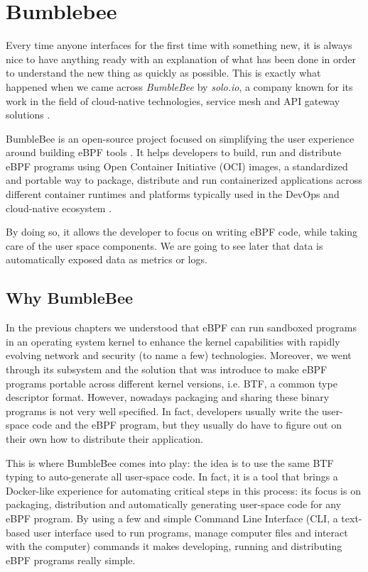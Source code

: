 \section{Bumblebee}

Every time anyone interfaces for the first time with something new, it is always nice to have anything ready with an explanation of what has been done in order to understand the new thing as quickly as possible.
This is exactly what happened when we came across \textit{BumbleBee} \cite{BumbleBeeWebsite} by \textit{solo.io}, a company known for its work in the field of cloud-native technologies, service mesh and API gateway solutions \cite{soloioWebsite}.

BumbleBee is an open-source project focused on simplifying the user experience around building eBPF tools \cite{BumbleBeeRepo}. 
It helps developers to build, run and distribute eBPF programs using Open Container Initiative (OCI) images, a standardized and portable way to package, distribute and run containerized applications across different container runtimes and platforms typically used in the DevOps and cloud-native ecosystem \cite{OCIRepo}.

By doing so, it allows the developer to focus on writing eBPF code, while taking care of the user space components.
We are going to see later that data is automatically exposed data as metrics or logs.

\subsection{Why BumbleBee}

In the previous chapters we understood that eBPF can run sandboxed programs in an operating system kernel to enhance the kernel capabilities with rapidly evolving network and security (to name a few) technologies.
Moreover, we went through its subsystem and the solution that was introduce to make eBPF programs portable across different kernel versions, i.e. BTF, a common type descriptor format.
However, nowadays packaging and sharing these binary programs is not very well specified. 
In fact, developers usually write the user-space code and the eBPF program, but they usually do have to figure out on their own how to distribute their application.

This is where BumbleBee comes into play: the idea is to use the same BTF typing to auto-generate all user-space code.
In fact, it is a tool that brings a Docker-like experience for automating critical steps in this process: its focus is on packaging, distribution and automatically generating user-space code for any eBPF program. 
By using a few and simple Command Line Interface (CLI, a text-based user interface
used to run programs, manage computer files and interact with the computer) commands it makes developing, running and distributing eBPF programs really simple.

